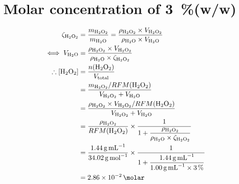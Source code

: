 \documentclass[a4paper, 12pt]{article}
\begin{document}
\section{Molar concentration of \SI{3}{\percent}(w/w) }\label{app:molar_conc_h2o2}
\begin{align*}
    \zeta_{\ce{H2O2}} 
    &= \dfrac{m_{\ce{H2O2}}}{m_{\ce{H2O}}}
     = \dfrac{\rho_{\ce{H2O2}} \times V_{\ce{H2O2}}}{\rho_{\ce{H2O}} \times V_{\ce{H2O}}}\\
    \iff V_{\ce{H2O}}
    &= \dfrac{\rho_{\ce{H2O2}} \times V_{\ce{H2O2}}}{\rho_{\ce{H2O}} \times \zeta_{\ce{H2O2}}}\\
    \therefore [\ce{H2O2}]
    &= \dfrac{n(\ce{H2O2})}{V_{\text{total}}}\\
    &= \dfrac{m_{\ce{H2O2}} / RFM(\ce{H2O2})}{V_{\ce{H2O2}} + V_{\ce{H2O}}}\\
    &= \dfrac{\rho_{\ce{H2O2}} \times V_{\ce{H2O2}} / RFM(\ce{H2O2})}{V_{\ce{H2O2}} + V_{\ce{H2O}}}\\
    &= \dfrac{\rho_{\ce{H2O2}}}{RFM(\ce{H2O2})} \times \dfrac{1}{1 + \dfrac{\rho_{\ce{H2O2}}}{\rho_{\ce{H2O}} \times \zeta_{\ce{H2O2}}}}\\
    &= \dfrac{\SI{1.44}{\g\per\mL}}{\SI{34.02}{\g\per\mol}} \times \dfrac{1}{1 + \dfrac{\SI{1.44}{\g\per\mL}}{\SI{1.00}{\g\per\mL} \times \SI{3}{\percent}}}\\
    &= \SI{2.86E-2}{\molar}
\end{align*}
\end{document}
